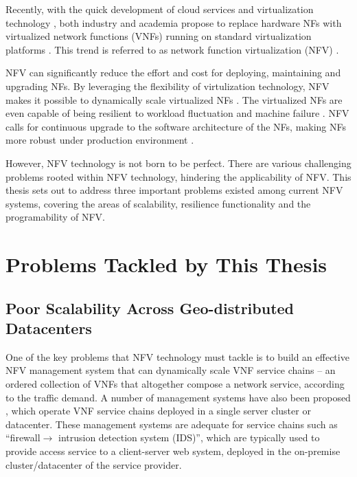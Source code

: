 Recently, with the quick development of cloud services \cite{ec2, azure, softlayer} and virtualization technology \cite{barham2003xen}, both industry and academia propose to replace hardware NFs with virtualized network functions (VNFs) running on standard virtualization platforms \cite{xen, kvm}. This trend is referred to as network function virtualization (NFV) \cite{nfv-white-paper}.

NFV can significantly reduce the effort and cost for deploying, maintaining and upgrading NFs. By leveraging the flexibility of virtulization technology, NFV makes it possible to dynamically scale virtualized NFs \cite{palkar2015e2}. The virtualized NFs are even capable of being resilient to workload fluctuation \cite{gember2012stratos} and machine failure \cite{sherry2015rollback}. NFV calls for continuous upgrade to the software architecture of the NFs, making NFs more robust under production environment \cite{201545}.

However, NFV technology is not born to be perfect. There are various challenging problems rooted within NFV technology, hindering the applicability of NFV. This thesis sets out to address three important problems existed among current NFV systems, covering the areas of scalability, resilience functionality and the programability of NFV.




\section{Problems Tackled by This Thesis}

\subsection {Poor Scalability Across Geo-distributed Datacenters}

One of the key problems that NFV technology must tackle is to build an effective NFV management system that can dynamically scale VNF service chains -- an ordered collection of VNFs that altogether compose a network service, according to the traffic demand.  A number of management systems have also been proposed \cite{palkar2015e2, gember2012stratos}, which operate VNF service chains deployed in a single server cluster or datacenter. These management systems are adequate for service chains such as ``firewall$\rightarrow$ intrusion detection system (IDS)'', which are typically used to provide access service to a client-server web system, deployed in the on-premise cluster/datacenter of the service provider.

